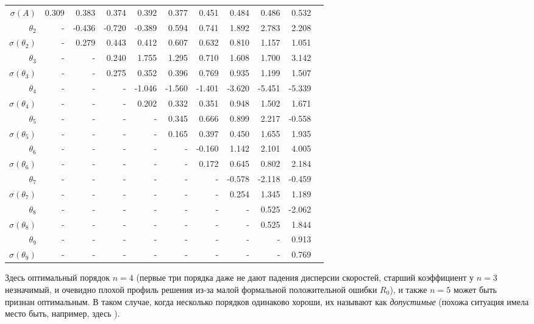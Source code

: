 \documentclass{matmex-diploma-custom}
\begin{document}
\begin{table}[h!!]
\begin{tabular}{r|rrr|rr|rrrrr}
 $\sigma(A) $ & 0.309       &   0.383 &   0.374 &   0.392 &   0.377 &   0.451 &   0.484 &   0.486 &   0.532 \\
 $\theta_2$&-        &  -0.436 &   -0.720 &  -0.389 &   0.594 &   0.741 &   1.892 &   2.783 &   2.208 \\
 $\sigma(\theta_2)$&-      &   0.279 &   0.443 &   0.412 &   0.607 &   0.632 &    0.810 &   1.157 &   1.051 \\
 $\theta_3$&-      &    - &   0.240 &   1.755 &   1.295 &   0.710 &   1.608 &   1.700 &   3.142 \\
 $\sigma(\theta_3)$&-      &    - &   0.275 &   0.352 &   0.396 &   0.769 &   0.935 &   1.199 &   1.507 \\
 $\theta_4$&-      &    - &    - &  -1.046 &  -1.560 &  -1.401 &  -3.620 &  -5.451 &  -5.339 \\
 $\sigma(\theta_4)$&-      &    - &    - &   0.202 &   0.332 &   0.351 &   0.948 &   1.502 &   1.671 \\
 $\theta_5$&-      &    - &    - &    - &  0.345 &   0.666 &   0.899 &   2.217 &  -0.558 \\
 $\sigma(\theta_5)$&-      &    - &    - &    - &   0.165 &   0.397 &   0.450 &   1.655 &   1.935 \\
 $\theta_6$&-      &    - &    - &    - &    - &   -0.160 &   1.142 &   2.101 &   4.005 \\
 $\sigma(\theta_6)$&-    &    - &    - &    - &    - &  0.172 &   0.645 &   0.802 &   2.184 \\
 $\theta_7$&-     &    - &    - &    - &    - &    - &  -0.578 &  -2.118 &  -0.459 \\
 $ \sigma(\theta_7)$&-     &    - &    - &    - &    - &    - &    0.254 &   1.345 &   1.189 \\
 $\theta_8$&-     &    - &    - &    - &    - &    - &    - &   0.525 &  -2.062 \\
 $ \sigma(\theta_8)$&-     &    - &    - &    - &    - &    - &    - &   0.525 &   1.844 \\
 $\theta_9$&-     &    - &    - &    - &    - &    - &    - &    - &  0.913 \\
 $ \sigma(\theta_9)$&-     &    - &    - &    - &    - &    - &    - &    - &   0.769 \\
\end{tabular}
\end{table}

\par Здесь оптимальный порядок $n=4$ (первые три порядка даже не дают падения дисперсии скоростей, старший коэффициент у $n=3$ незначимый, и очевидно плохой профиль решения из-за малой формальной положительной ошибки $R_0$), и также $n =5$ может быть признан оптимальным. В таком случае, когда несколько порядков одинаково хороши, их называют как \textit{допустимые} (похожа ситуация имела место быть, например, здесь \cite{NII}).
\end{document}

